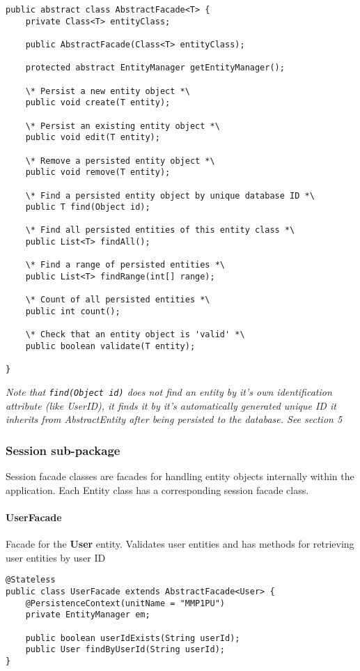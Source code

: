 \begin{small}\begin{verbatim}
public abstract class AbstractFacade<T> {
    private Class<T> entityClass;

    public AbstractFacade(Class<T> entityClass);

    protected abstract EntityManager getEntityManager();
    
    \* Persist a new entity object *\
    public void create(T entity);
    
    \* Persist an existing entity object *\
    public void edit(T entity);
    
    \* Remove a persisted entity object *\
    public void remove(T entity);
    
    \* Find a persisted entity object by unique database ID *\
    public T find(Object id);
    
    \* Find all persisted entities of this entity class *\
    public List<T> findAll();
    
    \* Find a range of persisted entities *\
    public List<T> findRange(int[] range);
    
    \* Count of all persisted entities *\
    public int count();
    
    \* Check that an entity object is 'valid' *\
    public boolean validate(T entity);
    
}

\end{verbatim}\end{small}
\textit{Note that \texttt{find(Object id)} does not find an entity by it's own identification attribute (like UserID), it finds it by it's automatically generated unique ID it inherits from AbstractEntity after being persisted to the database. See section 5}

\clearpage
\subsubsection{Session sub-package}
Session facade classes are facades for handling entity objects internally within the application. Each Entity class has a corresponding session facade class.

\paragraph{UserFacade}
Facade for the \textbf{User} entity. Validates user entities and has methods for retrieving user entities by user ID
\begin{small}\begin{verbatim}
@Stateless
public class UserFacade extends AbstractFacade<User> {
    @PersistenceContext(unitName = "MMP1PU")
    private EntityManager em;

    public boolean userIdExists(String userId);
    public User findByUserId(String userId);    
}
\end{verbatim}\end{small}

